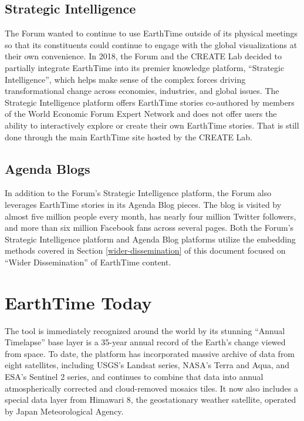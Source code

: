 \documentclass[
]{book}
\begin{document}
\hypertarget{strategic-intelligence}{%
\subsection*{Strategic Intelligence}\label{strategic-intelligence}}


The Forum wanted to continue to use EarthTime outside of its physical meetings so that its constituents could continue to engage with the global visualizations at their own convenience. In 2018, the Forum and the CREATE Lab decided to partially integrate EarthTime into its premier knowledge platform, ``Strategic Intelligence'', which helps make sense of the complex forces driving transformational change across economies, industries, and global issues. The Strategic Intelligence platform offers EarthTime stories co-authored by members of the World Economic Forum Expert Network and does not offer users the ability to interactively explore or create their own EarthTime stories. That is still done through the main EarthTime site hosted by the CREATE Lab.

\hypertarget{agenda-blogs}{%
\subsection*{Agenda Blogs}\label{agenda-blogs}}


In addition to the Forum's Strategic Intelligence platform, the Forum also leverages EarthTime stories in its Agenda Blog pieces. The blog is visited by almost five million people every month, has nearly four million Twitter followers, and more than six million Facebook fans across several pages. Both the Forum's Strategic Intelligence platform and Agenda Blog platforms utilize the embedding methods covered in Section \ref{wider-dissemination} of this document focused on ``Wider Dissemination'' of EarthTime content.

\hypertarget{earthtime-today}{%
\section{EarthTime Today}\label{earthtime-today}}

The tool is immediately recognized around the world by its stunning ``Annual Timelapse'' base layer is a 35-year annual record of the Earth's change viewed from space. To date, the platform has incorporated massive archive of data from eight satellites, including USGS's Landsat series, NASA's Terra and Aqua, and ESA's Sentinel 2 series, and continues to combine that data into annual atmospherically corrected and cloud-removed mosaics tiles. It now also includes a special data layer from Himawari 8, the geostationary weather satellite, operated by Japan Meteorological Agency.
\end{document}
